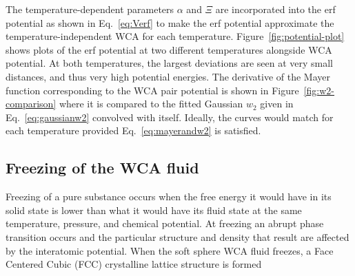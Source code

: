 \documentclass[letterpaper,twocolumn,amsmath,amssymb,prb]{revtex4-1}
\begin{document}
The temperature-dependent parameters $\alpha$ and $\Xi$ are incorporated 
into the erf potential as shown in Eq.~\ref{eq:Verf} to make the 
erf potential approximate the temperature-independent WCA for each temperature.
Figure~\ref{fig:potential-plot} 
shows plots of the erf potential at two different 
temperatures alongside WCA potential. At both temperatures, the largest 
deviations are seen at very small distances,
and thus very high potential energies.
The derivative of the Mayer function corresponding to the WCA pair potential 
is shown in Figure~\ref{fig:w2-comparison} where it is compared to the 
fitted Gaussian $w_2$ given in Eq.~\ref{eq:gaussianw2} convolved with itself. 
Ideally, the curves would match for each temperature provided 
Eq.~\ref{eq:mayerandw2} is satisfied.
%
%
% 
%
%
%
%
%



\subsection{Freezing of the WCA fluid}

Freezing of a pure substance occurs when the free energy it would have 
in its solid state is lower than what it would have its 
fluid state at the same temperature, pressure, and chemical potential. 
At freezing an abrupt phase transition occurs and the particular %
structure and density that result are affected by the interatomic potential. 
When the soft sphere WCA fluid freezes, a Face Centered Cubic (FCC) 
crystalline lattice structure is formed~%
\end{document}
